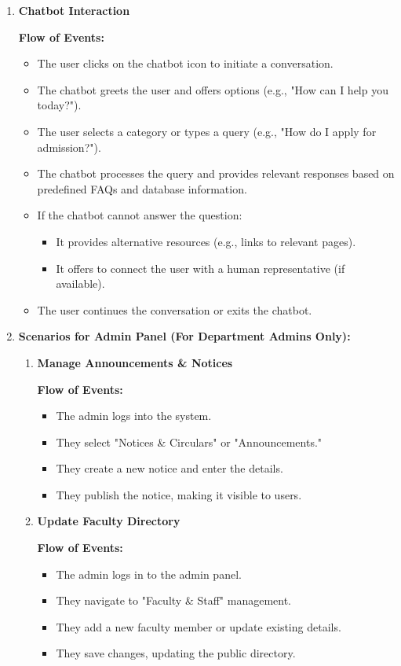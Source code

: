 \documentclass[11pt]{article}
\begin{document}
\begin{enumerate}
    \item \textbf{Chatbot Interaction} \par
    \textbf{Flow of Events:}
    \begin{itemize}
        \item The user clicks on the chatbot icon to initiate a conversation.
        \item The chatbot greets the user and offers options (e.g., "How can I help you today?").
        \item The user selects a category or types a query (e.g., "How do I apply for admission?").
        \item The chatbot processes the query and provides relevant responses based on predefined FAQs and database information.
        \item If the chatbot cannot answer the question:
        \begin{itemize}
            \item It provides alternative resources (e.g., links to relevant pages).
            \item It offers to connect the user with a human representative (if available).
        \end{itemize}
        \item The user continues the conversation or exits the chatbot.
    \end{itemize}

    \item \textbf{Scenarios for Admin Panel (For Department Admins Only):}
    \begin{enumerate}
        \item \textbf{Manage Announcements \& Notices} \par
    \textbf{Flow of Events:}
        \begin{itemize}
            \item The admin logs into the system.
            \item They select "Notices \& Circulars" or "Announcements."
            \item They create a new notice and enter the details.
            \item They publish the notice, making it visible to users.
        \end{itemize}

        \item \textbf{Update Faculty Directory} \par
    \textbf{Flow of Events:}
        \begin{itemize}
            \item The admin logs in to the admin panel.
            \item They navigate to "Faculty \& Staff" management.
            \item They add a new faculty member or update existing details.
            \item They save changes, updating the public directory.
        \end{itemize}


\end{enumerate}
\end{enumerate}
\end{document}
